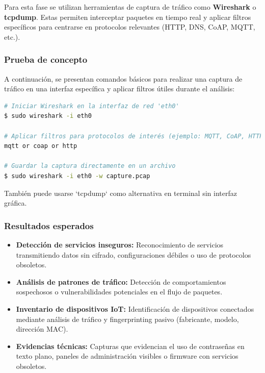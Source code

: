\documentclass[a4paper, 11pt]{article}
\begin{document}
Para esta fase se utilizan herramientas de captura de tráfico como \textbf{Wireshark} o \textbf{tcpdump}. Estas permiten interceptar paquetes en tiempo real y aplicar filtros específicos para centrarse en protocolos relevantes (HTTP, DNS, CoAP, MQTT, etc.).

\vspace{0.5cm}
\subsubsection*{Prueba de concepto}

A continuación, se presentan comandos básicos para realizar una captura de tráfico en una interfaz específica y aplicar filtros útiles durante el análisis:

\begin{lstlisting}[language=bash, style=terminalstyle, caption=Captura de tráfico con Wireshark]
# Iniciar Wireshark en la interfaz de red 'eth0'
$ sudo wireshark -i eth0

# Aplicar filtros para protocolos de interés (ejemplo: MQTT, CoAP, HTTP)
mqtt or coap or http

# Guardar la captura directamente en un archivo
$ sudo wireshark -i eth0 -w capture.pcap
\end{lstlisting}

También puede usarse `tcpdump` como alternativa en terminal sin interfaz gráfica.



\subsubsection*{Resultados esperados}

\begin{itemize}
    \item \textbf{Detección de servicios inseguros:} Reconocimiento de servicios transmitiendo datos sin cifrado, configuraciones débiles o uso de protocolos obsoletos.
    
    \item \textbf{Análisis de patrones de tráfico:} Detección de comportamientos sospechosos o vulnerabilidades potenciales en el flujo de paquetes.

    \item \textbf{Inventario de dispositivos IoT:} Identificación de dispositivos conectados mediante análisis de tráfico y fingerprinting pasivo (fabricante, modelo, dirección MAC).

    \item \textbf{Evidencias técnicas:} Capturas que evidencian el uso de contraseñas en texto plano, paneles de administración visibles o firmware con servicios obsoletos.

\end{itemize}
\end{document}

